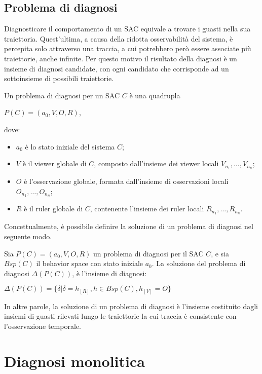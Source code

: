 \subsection{Problema di diagnosi}
Diagnosticare il comportamento di un SAC equivale a trovare i guasti nella sua traiettoria. Quest'ultima, a causa della ridotta osservabilità del sistema, è percepita solo attraverso una traccia, a cui potrebbero però essere associate più traiettorie, anche infinite. Per questo motivo il risultato della diagnosi è un insieme di diagnosi candidate, con ogni candidato che corrisponde ad un sottoinsieme di possibili traiettorie. 
\begin{defn}
Un problema di diagnosi per un SAC $C$ è una quadrupla
\begin{center}
$P(C) = (a_0,V,O,R)$,
\end{center}
dove:
\begin{itemize}
\item $a_0$ è lo stato iniziale del sistema $C$;
\item $V$ è il viewer globale di $C$, composto dall'insieme dei viewer locali $V_{n_1}, \ldots, V_{n_n}$;
\item $O$ è l'osservazione globale, formata dall'insieme di osservazioni locali $O_{n_1}, \ldots, O_{n_n}$;
\item $R$ è il ruler globale di $C$, contenente l'insieme dei ruler locali $R_{n_1}, \ldots, R_{n_n}$.
\end{itemize}
\end{defn}

Concettualmente, è possibile definire la soluzione di un problema di diagnosi nel seguente modo.
\begin{defn}
Sia $P(C) = (a_0,V,O,R)$ un problema di diagnosi per il SAC $C$, e sia $Bsp(C)$ il behavior space con stato iniziale $a_0$. La soluzione del problema di diagnosi $\Delta(P(C))$, è l'insieme di diagnosi:
\begin{center}
	$\Delta(P(C)) = \{ \delta | \delta = h_{[R]}, h \in Bsp(C), h_{[V]} = O\}$
\end{center}
\end{defn}
In altre parole, la soluzione di un problema di diagnosi è l'insieme costituito dagli insiemi di guasti rilevati lungo le traiettorie la cui traccia è consistente con l'osservazione temporale.

\section{Diagnosi monolitica}
